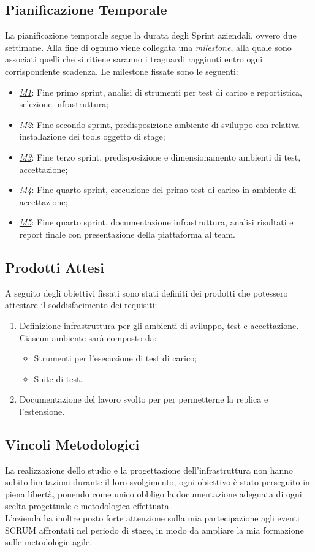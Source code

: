 \subsection{Pianificazione Temporale}
La pianificazione temporale segue la durata degli Sprint aziendali, ovvero due settimane. Alla fine di ognuno viene collegata una \textit{milestone}, alla quale sono associati quelli che si ritiene saranno i traguardi raggiunti entro ogni corrispondente scadenza.
Le milestone fissate sono le seguenti:
\begin{itemize}
	\item \underline{\textit{M1}}: Fine primo sprint, analisi di strumenti per test di carico e reportistica, selezione infrastruttura;
	\item \underline{\textit{M2}}: Fine secondo sprint, predisposizione ambiente di sviluppo con relativa installazione dei tools oggetto di stage;
	\item \underline{\textit{M3}}: Fine terzo sprint, predisposizione e dimensionamento ambienti di test, accettazione;
	\item \underline{\textit{M4}}: Fine quarto sprint, esecuzione del primo test di carico in ambiente di accettazione;
	\item \underline{\textit{M5}}: Fine quarto sprint, documentazione infrastruttura, analisi risultati e report finale con presentazione della piattaforma al team.
\end{itemize}
\subsection{Prodotti Attesi}
A seguito degli obiettivi fissati sono stati definiti dei prodotti che potessero attestare il soddisfacimento dei requisiti:
\begin{enumerate}
	\item Definizione infrastruttura per gli ambienti di sviluppo, test e accettazione.\\ 
	Ciascun ambiente sarà composto da:
	\begin{itemize}
		\item Strumenti per l'esecuzione di test di carico;
		\item Suite di test.
	\end{itemize}
	\item Documentazione del lavoro svolto per per permetterne la replica e l'estensione.
\end{enumerate}

\subsection{Vincoli Metodologici}
La realizzazione dello studio e la progettazione dell'infrastruttura non hanno subito limitazioni durante il loro svolgimento, ogni obiettivo è stato perseguito in piena libertà, ponendo come unico obbligo la documentazione adeguata di ogni scelta progettuale e metodologica effettuata. \\
L'azienda ha inoltre posto forte attenzione sulla mia partecipazione agli eventi SCRUM affrontati nel periodo di stage, in modo da ampliare la mia formazione sulle metodologie \gls{agile}.

